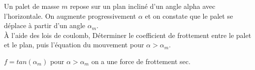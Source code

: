 \begin{Exercise}[title=Palet sur un plan incliné]
	Un palet de masse $m$ repose sur un plan incliné d'un angle alpha avec l'horizontale. On augmente progressivement $\alpha$ et on constate que le palet se déplace à partir d'un angle $\alpha_m$. \\
	À l'aide des lois de coulomb, Déterminer le coefficient de frottement entre le palet et le plan, puis l'équation du mouvement pour $\alpha > \alpha_m$.
\end{Exercise}
\begin{Answer}
  \Question $f=tan(\alpha_m)$
  \Question pour $\alpha> \alpha_m$ on a une force de frottement sec.
\end{Answer}
